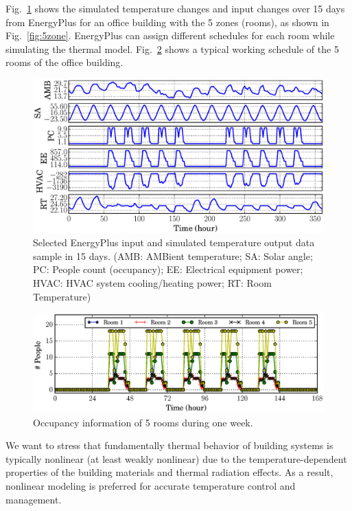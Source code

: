 Fig.~\ref{fig:energyplus-io-curve} shows the simulated temperature changes and
input changes over 15 days from EnergyPlus for an office building with the 5 zones
(rooms), as shown in Fig.~\ref{fig:5zone}. EnergyPlus can assign different schedules
for each room while simulating the thermal model.
Fig.~\ref{fig:occupancy-curve} shows a typical working schedule of the 5 rooms
of the office building.

\begin{figure}[t]
    \includegraphics[width=0.9\columnwidth]{figs/energyplus_review/energyplus}
    \caption{Selected EnergyPlus input and simulated temperature output data sample in
        15 days.  (AMB: AMBient temperature; SA: Solar angle; PC: People count
        (occupancy); EE: Electrical equipment power; HVAC: HVAC system
        cooling/heating power; RT: Room Temperature)}
    \label{fig:energyplus-io-curve}
\end{figure}
\begin{figure}[t]
\centering
\includegraphics[width=0.9\columnwidth]{figs/energyplus_review/occupancy}
\caption{Occupancy information of 5 rooms during one week.}
\label{fig:occupancy-curve}
\end{figure}

We want to stress that fundamentally thermal behavior of building
systems is typically nonlinear (at least weakly nonlinear) due to the
temperature-dependent properties of the building materials and thermal
radiation effects. As a result, nonlinear modeling is preferred for accurate temperature
control and management.
